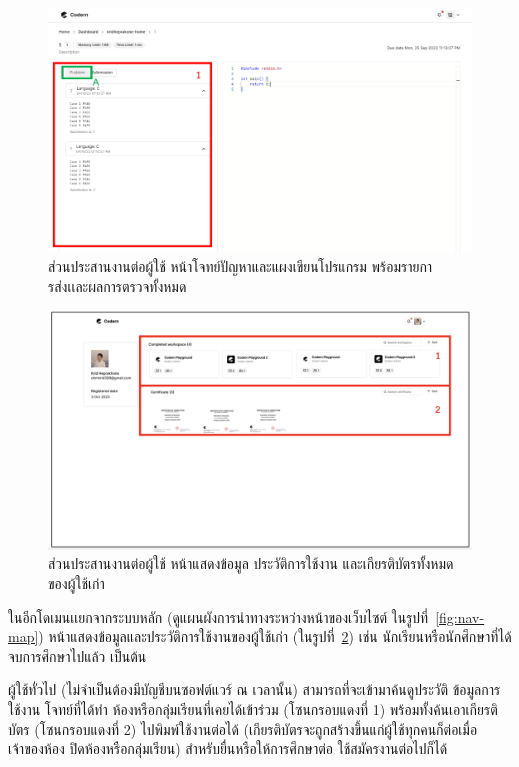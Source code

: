 \documentclass[12pt,one side,openright,a4paper]{cpe-thesis-th}
\newcommand{\thaijustify}[1]{%
  \par\hspace{30pt}\justifying
  #1
}
\begin{document}
\hypertarget{ui-code2}{
  \begin{figure}[H]
    \centering
    \includegraphics[width=15cm]{figure/ui/ui-code2.png}
    \caption[ส่วนประสานงานต่อผู้ใช้ หน้าโจทย์ปัญหาและแผงเขียนโปรแกรม พร้อมรายการส่งเเละผลการตรวจทั้งหมด]{ส่วนประสานงานต่อผู้ใช้ หน้าโจทย์ปัญหาและแผงเขียนโปรแกรม พร้อมรายการส่งเเละผลการตรวจทั้งหมด}
    \label{fig:ui-code2}
  \end{figure}
}
\hypertarget{ui-archive1}{
  \begin{figure}[H]
    \centering
    \includegraphics[width=15cm]{figure/ui/ui-archive1.png}
    \caption[ส่วนประสานงานต่อผู้ใช้ หน้าแสดงข้อมูลของผู้ใช้เก่า]{ส่วนประสานงานต่อผู้ใช้ หน้าแสดงข้อมูล ประวัติการใช้งาน และเกียรติบัตรทั้งหมด ของผู้ใช้เก่า}
    \label{fig:ui-archive1}
  \end{figure}
}
\thaijustify{
  ในอีกโดเมนเเยกจากระบบหลัก (ดูแผนผังการนำทางระหว่างหน้าของเว็บไซต์ ในรูปที่~\ref{fig:nav-map}) หน้าแสดงข้อมูลและประวัติการใช้งานของผู้ใช้เก่า (ในรูปที่~\ref{fig:ui-archive1}) เช่น นักเรียนหรือนักศึกษาที่ได้จบการศึกษาไปแล้ว เป็นต้น
}
\thaijustify{
  ผู้ใช้ทั่วไป (ไม่จำเป็นต้องมีบัญชีบนซอฟต์แวร์ ณ เวลานั้น) สามารถที่จะเข้ามาค้นดูประวัติ ข้อมูลการใช้งาน โจทย์ที่ได้ทำ ห้องหรือกลุ่มเรียนที่เคยได้เข้าร่วม (โซนกรอบแดงที่ 1) พร้อมทั้งค้นเอาเกียรติบัตร (โซนกรอบแดงที่ 2) ไปพิมพ์ใช้งานต่อได้ (เกียรติบัตรจะถูกสร้างขึ้นแก่ผู้ใช้ทุกคนก็ต่อเมื่อเจ้าของห้อง ปิดห้องหรือกลุ่มเรียน) สำหรับยื่นหรือให้การศึกษาต่อ ใช้สมัครงานต่อไปก็ได้
}
\pagebreak
\end{document}
